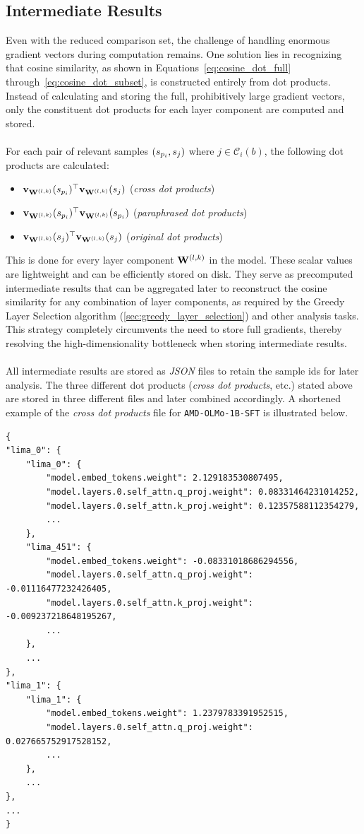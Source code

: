 \subsection{Intermediate Results}\label{subsec:intermediate_results}
Even with the reduced comparison set, the challenge of handling enormous gradient vectors during computation remains. One solution lies in recognizing that cosine similarity, as shown in Equations~\ref{eq:cosine_dot_full} through~\ref{eq:cosine_dot_subset}, is constructed entirely from dot products. Instead of calculating and storing the full, prohibitively large gradient vectors, only the constituent dot products for each layer component are computed and stored.
\\\\
For each pair of relevant samples $(\spi, \sj)$ where $j \in \mathcal{C}_i(b)$, the following dot products are calculated:
\begin{itemize}
    \item $\vXspi[\Wlk]^{\top}\vXsj[\Wlk]$ \quad (\emph{cross dot products})
    \item $\vXspi[\Wlk]^{\top}\vXspi[\Wlk]$ \quad (\emph{paraphrased dot products})
    \item $\vXsj[\Wlk]^{\top}\vXsj[\Wlk]$ \quad (\emph{original dot products})
\end{itemize}
This is done for every layer component $\Wlk$ in the model. These scalar values are lightweight and can be efficiently stored on disk. They serve as precomputed intermediate results that can be aggregated later to reconstruct the cosine similarity for any combination of layer components, as required by the Greedy Layer Selection algorithm (\autoref{sec:greedy_layer_selection}) and other analysis tasks. This strategy completely circumvents the need to store full gradients, thereby resolving the high-dimensionality bottleneck when storing intermediate results.
\\\\
All intermediate results are stored as \emph{JSON} files to retain the sample ids for later analysis. The three different dot products (\emph{cross dot products}, etc.) stated above are stored in three different files and later combined accordingly. A shortened example of the \emph{cross dot products} file for \texttt{AMD-OLMo-1B-SFT} is illustrated below.
\begin{verbatim}
{
"lima_0": {
    "lima_0": {
        "model.embed_tokens.weight": 2.129183530807495,
        "model.layers.0.self_attn.q_proj.weight": 0.08331464231014252,
        "model.layers.0.self_attn.k_proj.weight": 0.12357588112354279,
        ...
    },
    "lima_451": {
        "model.embed_tokens.weight": -0.08331018686294556,
        "model.layers.0.self_attn.q_proj.weight": -0.01116477232426405,
        "model.layers.0.self_attn.k_proj.weight": -0.009237218648195267,
        ...
    },
    ...
},
"lima_1": {
    "lima_1": {
        "model.embed_tokens.weight": 1.2379783391952515,
        "model.layers.0.self_attn.q_proj.weight": 0.027665752917528152,
        ...
    },
    ...
},
...
}
\end{verbatim}

